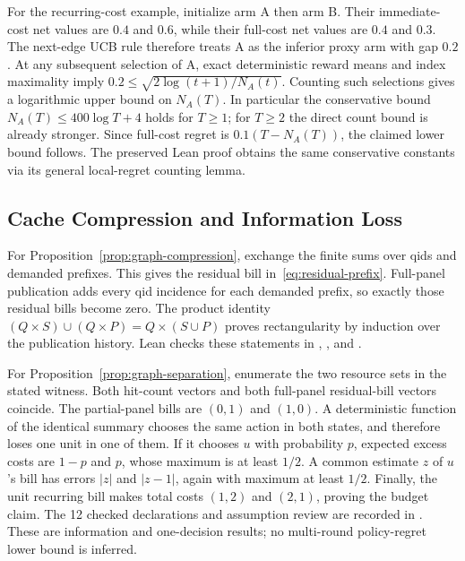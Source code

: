 For the recurring-cost example, initialize arm A then arm B. Their immediate-cost net values are $0.4$ and $0.6$, while their full-cost net values are $0.4$ and $0.3$. The next-edge UCB rule therefore treats A as the inferior proxy arm with gap $0.2$. At any subsequent selection of A, exact deterministic reward means and index maximality imply $0.2\le\sqrt{2\log(t+1)/N_A(t)}$. Counting such selections gives a logarithmic upper bound on $N_A(T)$. In particular the conservative bound $N_A(T)\le400\log T+4$ holds for $T\ge1$; for $T\ge2$ the direct count bound is already stronger. Since full-cost regret is $0.1(T-N_A(T))$, the claimed lower bound follows. The preserved Lean proof obtains the same conservative constants via its general local-regret counting lemma.

\subsection{Cache Compression and Information Loss}
For Proposition~\ref{prop:graph-compression}, exchange the finite sums over qids and demanded prefixes. This gives the residual bill in~\eqref{eq:residual-prefix}. Full-panel publication adds every qid incidence for each demanded prefix, so exactly those residual bills become zero. The product identity $(Q\times S)\cup(Q\times P)=Q\times(S\cup P)$ proves rectangularity by induction over the publication history. Lean checks these statements in , , and .

For Proposition~\ref{prop:graph-separation}, enumerate the two resource sets in the stated witness. Both hit-count vectors and both full-panel residual-bill vectors coincide. The partial-panel bills are $(0,1)$ and $(1,0)$. A deterministic function of the identical summary chooses the same action in both states, and therefore loses one unit in one of them. If it chooses $u$ with probability $p$, expected excess costs are $1-p$ and $p$, whose maximum is at least $1/2$. A common estimate $z$ of $u$'s bill has errors $|z|$ and $|z-1|$, again with maximum at least $1/2$. Finally, the unit recurring bill makes total costs $(1,2)$ and $(2,1)$, proving the budget claim. The 12 checked declarations and assumption review are recorded in . These are information and one-decision results; no multi-round policy-regret lower bound is inferred.

